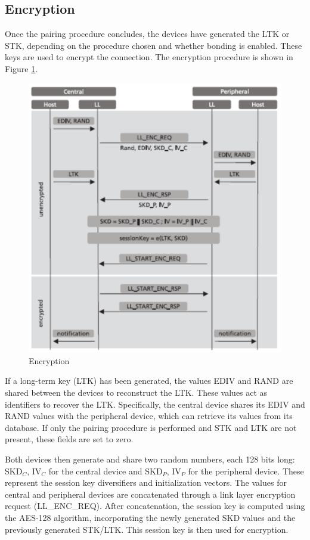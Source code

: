\documentclass{Configuration_Files/PoliMi3i_thesis}
\begin{document}
\subsection{Encryption}

Once the pairing procedure concludes, the devices have generated the LTK or STK, depending on the procedure chosen and whether bonding is enabled. These keys are used to encrypt the connection. The encryption procedure is shown in Figure \ref{bluetooth_sec_9}.

\begin{figure}[H]
    \centering
    \includegraphics[scale=0.7]{Bluetooth_Security/9.png}
    \caption{Encryption \cite{casarSurveyBluetoothLow2022}}
    \label{bluetooth_sec_9}
\end{figure}

If a long-term key (LTK) has been generated, the values EDIV and RAND are shared between the devices to reconstruct the LTK. These values act as identifiers to recover the LTK. Specifically, the central device shares its EDIV and RAND values with the peripheral device, which can retrieve its values from its database. If only the pairing procedure is performed and STK and LTK are not present, these fields are set to zero. 

Both devices then generate and share two random numbers, each 128 bits long: \( \text{SKD}_C \), \( \text{IV}_C \) for the central device and \( \text{SKD}_P \), \( \text{IV}_P \) for the peripheral device. These represent the session key diversifiers and initialization vectors. The values for central and peripheral devices are concatenated through a link layer encryption request (LL\_ENC\_REQ). After concatenation, the session key is computed using the AES-128 algorithm, incorporating the newly generated SKD values and the previously generated STK/LTK. This session key is then used for encryption.
\end{document}
